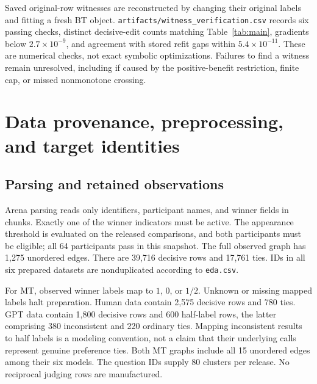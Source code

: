 Saved original-row witnesses are reconstructed by changing their original labels and fitting a fresh BT object. \texttt{artifacts/witness\_verification.csv} records six passing checks, distinct decisive-edit counts matching Table~\ref{tab:main}, gradients below $2.7\times10^{-9}$, and agreement with stored refit gaps within $5.4\times10^{-11}$. These are numerical checks, not exact symbolic optimizations. Failures to find a witness remain unresolved, including if caused by the positive-benefit restriction, finite cap, or missed nonmonotone crossing.

\section{Data provenance, preprocessing, and target identities}
\label{app:data}
\begin{table}[htbp]
\centering
\caption{Data quality-control summary. For NBA, ``raw rows'' means the selected season's deduplicated game rows entering the audit, not every team-side record in the full historical source. Clusters are resampling units, not assertions of independence. Source: \texttt{artifacts/eda.csv}; generated input: \texttt{paper/tables/eda.tex}.}
\label{tab:eda}
{\small}
\end{table}

\subsection{Parsing and retained observations}
Arena parsing reads only identifiers, participant names, and winner fields in chunks. Exactly one of the winner indicators must be active. The appearance threshold is evaluated on the released comparisons, and both participants must be eligible; all 64 participants pass in this snapshot. The full observed graph has 1,275 unordered edges. There are 39,716 decisive rows and 17,761 ties. IDs in all six prepared datasets are nonduplicated according to \texttt{eda.csv}.

For MT, observed winner labels map to $1$, $0$, or $1/2$. Unknown or missing mapped labels halt preparation. Human data contain 2,575 decisive rows and 780 ties. GPT data contain 1,800 decisive rows and 600 half-label rows, the latter comprising 380 inconsistent and 220 ordinary ties. Mapping inconsistent results to half labels is a modeling convention, not a claim that their underlying calls represent genuine preference ties. Both MT graphs include all 15 unordered edges among their six models. The question IDs supply 80 clusters per release. No reciprocal judging rows are manufactured.

